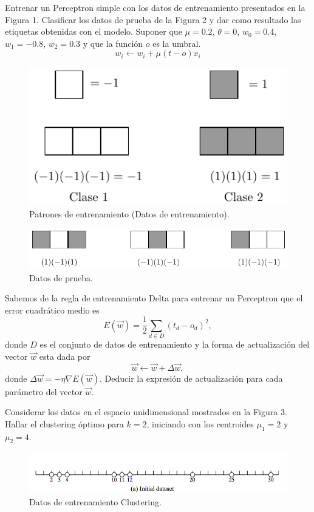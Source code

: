 \documentclass[12pt]{exam}
\begin{document}
\begin{questions}
\question[4] Entrenar un Perceptron simple con los datos de entrenamiento presentados en la Figura 1. Clasificar los datos de prueba de la Figura 2 y dar como resultado las etiquetas obtenidas con el modelo. Suponer que $\mu=0.2$, $\theta=0$, $w_0=0.4$, $w_1=-0.8$, $w_2=0.3$ y que la funci\'on $o$ es la umbral.
\begin{equation*}
w_i\leftarrow w_i+\mu(t-o)x_i
\end{equation*}
\begin{figure}[h!]
\center
\includegraphics[scale=1.2]{redes-1.pdf} 
\caption{Patrones de entrenamiento (Datos de entrenamiento).}
\end{figure}
\begin{figure}[h!]
\center
\includegraphics[scale=1.2]{redes-2.pdf} 
\caption{Datos de prueba.}
\end{figure}
\addpoints

\question[3] Sabemos de la regla de entrenamiento Delta para entrenar un Perceptron que el error cuadr\'atico medio es
\begin{equation*}
	E(\vec{w})=\frac{1}{2}\displaystyle\sum_{d\in D}(t_d-o_d)^2,
\end{equation*}
donde $D$ es el conjunto de datos de entrenamiento y la forma de actualizaci\'on del vector $\vec{w}$ esta dada por
\begin{equation*}
	\vec{w}\leftarrow \vec{w}+\Delta\vec{w},
\end{equation*}
donde $\Delta\vec{w}=-\eta\nabla E(\vec{w})$. Deducir la expresi\'on de actualizaci\'on para cada par\'ametro del vector $\vec{w}$.
\addpoints

\question[3] Considerar los datos en el espacio unidimensional mostrados en la Figura 3. Hallar el clustering \'optimo para $k=2$, iniciando con los centroides $\mu_1=2$ y $\mu_2=4$.
\begin{figure}[h!]
\center
\includegraphics[scale=0.6]{ejempl1-1D-kmeans.png} 
\caption{Datos de entrenamiento Clustering.}
\end{figure}
\addpoints


\end{questions}
\end{document}
